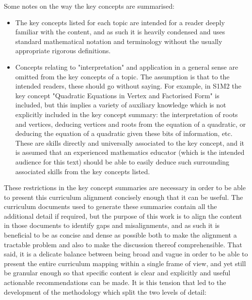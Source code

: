 \documentclass[twoside,12pt,a4paper]{report}
\begin{document}
Some notes on the way the key concepts are summarised:
\begin{itemize}
	\item The key concepts listed for each topic are intended for a reader deeply familiar with the content, and as such it is heavily condensed and uses standard mathematical notation and terminology without the usually appropriate rigorous definitions. 
	\item Concepts relating to "interpretation" and application in a general sense are omitted from the key concepts of a topic. The assumption is that to the intended readers, these should go without saying. For example, in S1M2 the key concept "Quadratic Equations in Vertex and Factorised Form" is included, but this implies a variety of auxiliary knowledge which is not explicitly included in the key concept summary: the interpretation of roots and vertices, deducing vertices and roots from the equation of a quadratic, or deducing the equation of a quadratic given these bits of information, etc. These are skills directly and universally associated to the key concept, and it is assumed that an experienced mathematics educator (which is the intended audience for this text) should be able to easily deduce such surrounding associated skills from the key concepts listed. 
\end{itemize}
These restrictions in the key concept summaries are necessary in order to be able to present this curriculum alignment concisely enough that it can be useful. The curriculum documents used to generate these summaries contain all the additional detail if required, but the purpose of this work is to align the content in those documents to identify gaps and misalignments, and as such it is beneficial to be as concise and dense as possible both to make the alignment a tractable problem and also to make the discussion thereof comprehensible. That said, it is a delicate balance between being broad and vague in order to be able to present the entire curriculum mapping within a single frame of view, and yet still be granular enough so that specific content is clear and explicitly and useful actionable recommendations can be made. It is this tension that led to the development of the methodology which split the two levels of detail: 
\end{document}
